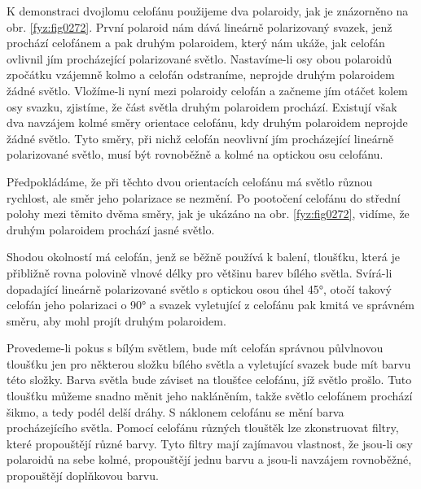     K demonstraci dvojlomu celofánu použijeme dva polaroidy, jak je znázorněno na obr.
    \ref{fyz:fig0272}. První polaroid nám dává lineárně polarizovaný svazek, jenž prochází celofánem
    a pak druhým polaroidem, který nám ukáže, jak celofán ovlivnil jím procházející polarizované
    světlo. Nastavíme-li osy obou polaroidů zpočátku vzájemně kolmo a celofán odstraníme, neprojde
    druhým polaroidem žádné světlo. Vložíme-li nyní mezi polaroidy celofán a začneme jím otáčet
    kolem osy svazku, zjistíme, že část světla druhým polaroidem prochází. Existují však dva
    navzájem kolmé směry orientace celofánu, kdy druhým polaroidem neprojde žádné světlo. Tyto
    směry, při nichž celofán neovlivní jím procházející lineárně polarizované světlo, musí být
    rovnoběžně a kolmé na optickou osu celofánu.

    Předpokládáme, že při těchto dvou orientacích celofánu má světlo různou rychlost, ale směr jeho
    polarizace se nezmění. Po pootočení celofánu do střední polohy mezi těmito dvěma směry, jak je
    ukázáno na obr. \ref{fyz:fig0272}, vidíme, že druhým polaroidem prochází jasné světlo.

    Shodou okolností má celofán, jenž se běžně používá k balení, tloušťku, která je přibližně
    rovna polovině vlnové délky pro většinu barev bílého světla. Svírá-li dopadající lineárně
    polarizované světlo s optickou osou úhel \ang{45}, otočí takový celofán jeho polarizaci o
    \ang{90} a svazek vyletující z celofánu pak kmitá ve správném směru, aby mohl projít druhým
    polaroidem.

    Provedeme-li pokus s bílým světlem, bude mít celofán správnou půlvlnovou tloušťku jen pro
    některou složku bílého světla a vyletující svazek bude mít barvu této složky. Barva světla bude
    záviset na tloušťce celofánu, jíž světlo prošlo. Tuto tloušťku můžeme snadno měnit jeho
    nakláněním, takže světlo celofánem prochází šikmo, a tedy podél delší dráhy. S náklonem celofánu
    se mění barva procházejícího světla. Pomocí celofánu různých tlouštěk lze zkonstruovat ﬁltry,
    které propouštějí různé barvy. Tyto ﬁltry mají zajímavou vlastnost, že jsou-li osy polaroidů na
    sebe kolmé, propouštějí jednu barvu a jsou-li navzájem rovnoběžné, propouštějí doplňkovou barvu.


